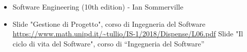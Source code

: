 \begin{itemize}
    \item Software Engineering (10th edition) - Ian Sommerville
    \item Slide "Gestione di Progetto", corso di Ingegneria del Software
          \newline \url{https://www.math.unipd.it/~tullio/IS-1/2018/Dispense/L06.pdf}
    \itrm Slide "Il ciclo di vita del Software", corso di “Ingegneria del Software”
\end{itemize}